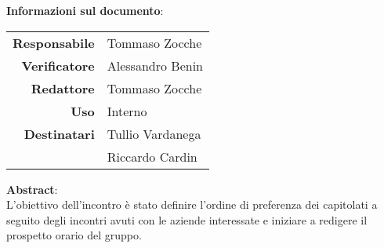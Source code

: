 \begin{center}
\textbf{Informazioni sul documento}: \\
\vspace{0.5cm}

\begin{tabular}{r|l}
    \textbf{Responsabile} & Tommaso Zocche \\ 
    \textbf{Verificatore} & Alessandro Benin \\ 
    \textbf{Redattore} & Tommaso Zocche \\ 
    \textbf{Uso} & Interno \\ 
    \textbf{Destinatari} & Tullio Vardanega \\ & Riccardo Cardin \\ 
\end{tabular}

\vfill

\textbf{Abstract}: \\
\vspace{0.5cm}
L'obiettivo dell'incontro è stato definire l'ordine di preferenza dei capitolati a seguito degli incontri avuti con le aziende interessate e iniziare a redigere il prospetto orario del gruppo.
\end{center}


\bigskip